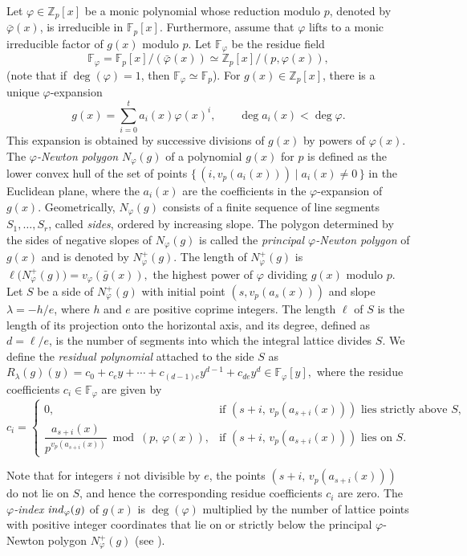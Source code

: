 \documentclass[table]{amsart}
\newcommand{\Z}{\mathbb{Z}}
\newcommand{\F}{\mathbb{F}}
\numberwithin{equation}{section}
\begin{document}
Let $\varphi\in\Z_p[x]$ be a monic polynomial whose reduction modulo $p$, denoted by $\bar\varphi(x)$,
is irreducible in $\F_p[x]$. Furthermore, assume that $\varphi$ lifts to a monic irreducible factor
of $g(x)$ modulo $p$. Let $\F_\varphi$ be the residue field
\[
\F_\varphi=\F_p[x]/(\bar\varphi(x))\simeq\Z_p[x]/(p,\varphi(x)),
\]
(note that if $\deg(\varphi)=1$, then $\F_\varphi\simeq\F_p$).
For $g(x)\in\Z_p[x]$, there is a unique $\varphi$-expansion
\[
g(x)=\sum_{i=0}^t a_i(x)\varphi(x)^i,
\qquad \deg a_i(x)<\deg\varphi.
\]
This expansion is obtained by successive divisions of $g(x)$ by powers of $\varphi(x)$. The \emph{$\varphi$-Newton polygon} $N_\varphi(g)$ of a polynomial $g(x)$ for $p$ is defined as
the lower convex hull of the set of points $\{\, (i, v_p(a_i(x))) \mid a_i(x)\ne 0 \,\}$ in the Euclidean plane, where the $a_i(x)$ are the coefficients in the $\varphi$-expansion of $g(x)$. Geometrically, $N_\varphi(g)$ consists of a finite sequence of line segments $S_1,\dots,S_r$, called \emph{sides}, ordered by increasing slope. The polygon determined by the sides of negative slopes of $N_\varphi(g)$ is called the \emph{principal $\varphi$-Newton polygon} of $g(x)$ and is denoted by $N_\varphi^+(g)$. The length of $N_\varphi^+(g)$ is $\ell\bigl(N_\varphi^+(g)\bigr)=v_\varphi(\bar g(x)),$ the highest power of $\varphi$ dividing $g(x)$ modulo $p$. Let $S$ be a side of $N_\varphi^+(g)$ with initial point $(s,v_p(a_s(x)))$ and slope $\lambda=-h/e$, where $h$ and $e$ are positive coprime integers. The length $\ell$ of $S$ is the length of its projection onto the horizontal axis, and its degree, defined as $d=\ell/e$, is the number of segments into which the integral lattice divides $S$. We define the \emph{residual polynomial} attached to the side $S$ as $R_\lambda(g)(y)=c_0+c_ey+\cdots+c_{(d-1)e}y^{d-1}+c_{de}y^d\in\F_\varphi[y],$ where the residue coefficients $c_i\in\F_\varphi$ are given by
\[
c_i=
\begin{cases}
0, & \text{if } (s+i,\,v_p(a_{s+i}(x))) \text{ lies strictly above } S,\\[0.4em]
\dfrac{a_{s+i}(x)}{p^{v_p(a_{s+i}(x))}} \bmod (p,\,\varphi(x)),
& \text{if } (s+i,\,v_p(a_{s+i}(x))) \text{ lies on } S.
\end{cases}
\]

Note that for integers $i$ not divisible by $e$, the points $(s+i,\, v_p(a_{s+i}(x)))$ do not lie on $S$,
and hence the corresponding residue coefficients $c_i$ are zero.
The \emph{$\varphi$-index} $\it{ind}_\varphi(g)$ of $g(x)$ is $\deg(\varphi)$ multiplied by the number
of lattice points with positive integer coordinates that lie on or strictly below the principal
$\varphi$-Newton polygon $N_\varphi^+(g)$ (see \cite[Definition~1.3]{EFMN12}).
\end{document}
